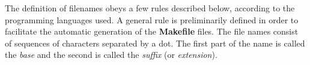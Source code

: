 
The definition of filenames obeys a few rules described below, according to the programming languages used. A general rule is preliminarily defined in order to facilitate the automatic generation of the {\bf Makefile} files. The file names consist of sequences of characters separated by a dot. The first part of the name is called the \emph{base} and the second is called the \emph{suffix} (or \emph{extension}).


